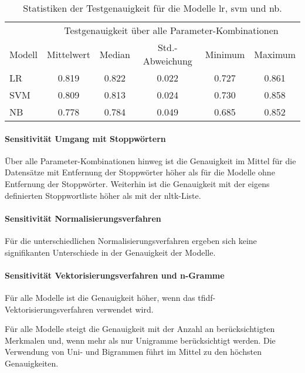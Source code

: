 \begin{table}
    \center
    \begin{tabular}{lccccc}
        \toprule
        & \multicolumn{5}{c}{Testgenauigkeit über alle Parameter-Kombinationen} \\
        Modell             & Mittelwert & Median & Std.-Abweichung & Minimum & Maximum \\
        \midrule
        LR                 & 0.819      & 0.822  & 0.022           & 0.727   & 0.861 \\
        SVM                & 0.809      & 0.813  & 0.024           & 0.730   & 0.858 \\
        NB                 & 0.778      & 0.784  & 0.049           & 0.685   & 0.852 \\
        \bottomrule
    \end{tabular}
    \caption{Statistiken der Testgenauigkeit für die Modelle \gls{lr}, \gls{svm} und \gls{nb}.}
    \label{tab:stats-per-model}
\end{table}

\paragraph{Sensitivität Umgang mit Stoppwörtern}

Über alle Parameter-Kombinationen hinweg ist die Genauigkeit im Mittel für die Datensätze mit Entfernung der Stoppwörter höher als für die Modelle ohne Entfernung der Stoppwörter.
Weiterhin ist die Genauigkeit mit der eigens definierten Stoppwortliste höher als mit der \gls{nltk}-Liste.

\paragraph{Sensitivität Normalisierungsverfahren}

Für die unterschiedlichen Normalisierungsverfahren ergeben sich keine signifikanten Unterschiede in der Genauigkeit der Modelle.

\paragraph{Sensitivität Vektorisierungsverfahren und n-Gramme}

Für alle Modelle ist die Genauigkeit höher, wenn das \gls{tfidf}-Vektorisierungsverfahren verwendet wird.

Für alle Modelle steigt die Genauigkeit mit der Anzahl an berücksichtigten Merkmalen und, wenn mehr als nur Unigramme berücksichtigt werden.
Die Verwendung von Uni- und Bigrammen führt im Mittel zu den höchsten Genauigkeiten.

